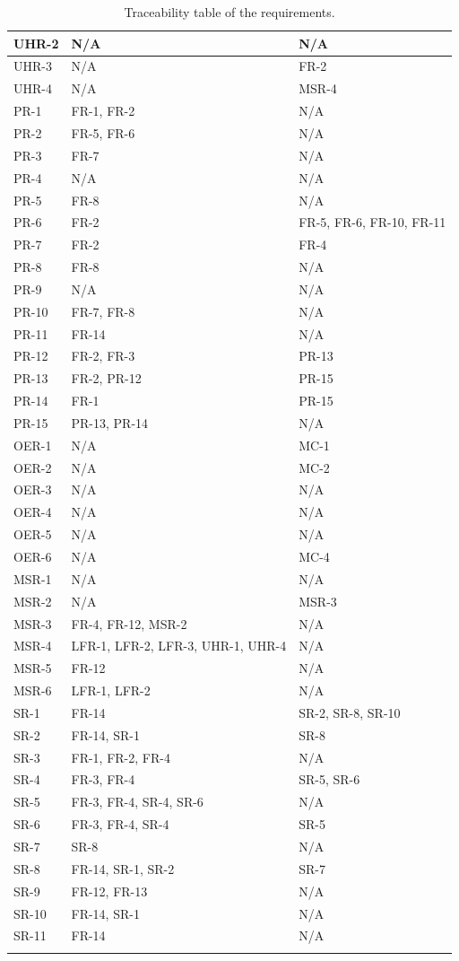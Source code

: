 \documentclass[12pt]{article}
\begin{document}
\begin{longtable}[c]{| m{3.4cm} | m{4cm} | m{5.3cm} |}
  UHR-2 & N/A & N/A \\ \hline
  UHR-3 & N/A & FR-2 \\ \hline
  UHR-4 & N/A & MSR-4 \\ \hline
  PR-1 & FR-1, FR-2 & N/A \\ \hline
  PR-2 & FR-5, FR-6 & N/A \\ \hline
  PR-3 & FR-7 & N/A \\ \hline
  PR-4 & N/A & N/A \\ \hline
  PR-5 & FR-8 & N/A \\ \hline
  PR-6 & FR-2 & FR-5, FR-6, FR-10, FR-11 \\ \hline
  PR-7 & FR-2 & FR-4 \\ \hline
  PR-8 & FR-8 & N/A \\ \hline
  PR-9 & N/A & N/A \\ \hline
  PR-10 & FR-7, FR-8 & N/A \\ \hline
  PR-11 & FR-14 & N/A \\ \hline
  PR-12 & FR-2, FR-3 & PR-13 \\ \hline
  PR-13 & FR-2, PR-12 & PR-15 \\ \hline
  PR-14 & FR-1 & PR-15 \\ \hline
  PR-15 & PR-13, PR-14 & N/A \\ \hline
  OER-1 & N/A & MC-1 \\ \hline
  OER-2 & N/A & MC-2 \\ \hline
  OER-3 & N/A & N/A \\ \hline
  OER-4 & N/A & N/A \\ \hline
  OER-5 & N/A & N/A \\ \hline
  OER-6 & N/A & MC-4 \\ \hline
  MSR-1 & N/A & N/A \\ \hline
  MSR-2 & N/A & MSR-3 \\ \hline
  MSR-3 & FR-4, FR-12, MSR-2 & N/A \\ \hline
  MSR-4 & LFR-1, LFR-2, LFR-3, UHR-1, UHR-4 & N/A \\ \hline
  MSR-5 & FR-12 & N/A \\ \hline
  MSR-6 & LFR-1, LFR-2 & N/A \\ \hline
  SR-1 & FR-14 & SR-2, SR-8, SR-10 \\ \hline
  SR-2 & FR-14, SR-1 & SR-8 \\ \hline
  SR-3 & FR-1, FR-2, FR-4 & N/A \\ \hline
  SR-4 & FR-3, FR-4 & SR-5, SR-6 \\ \hline
  SR-5 & FR-3, FR-4, SR-4, SR-6 & N/A \\ \hline
  SR-6 & FR-3, FR-4, SR-4 & SR-5 \\ \hline
  SR-7 & SR-8 & N/A \\ \hline
  SR-8 & FR-14, SR-1, SR-2 & SR-7 \\ \hline
  SR-9 & FR-12, FR-13 & N/A \\ \hline
  SR-10 & FR-14, SR-1 & N/A \\ \hline
  SR-11 & FR-14 & N/A \\ \hline
  \caption{Traceability table of the requirements.}
  \label{table:trace}
\end{longtable}
\end{document}
